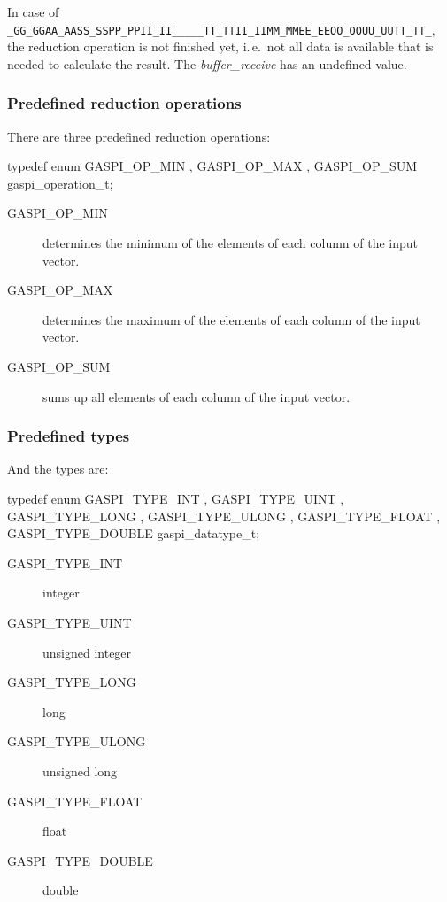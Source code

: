 \documentclass[a4paper]{article}
\makeatletter
\newlength{\st}\setlength{\st}{0pt}
\newcommand{\zerowsep}{\hskip 0pt plus 0.1pt minus 0.1pt}
\newcommand{\ZSEP}[1]{\ifx#1\@@@EOZ@@@\let\next\relax\else\ifx#1\_#1\zerowsep\else#1\fi\let\next\ZSEP\fi\next}
\newcommand{\zsep}[1]{\ZSEP{}#1\@@@EOZ@@@}
\newcommand{\gaspiprefix}{gaspi}
\newcommand{\function}[1]{{\tt #1}}
\newcommand{\parameter}[1]{{\it #1}}
\newcommand{\gaspifunction}[1]{\function{\protect\zsep{\gaspiprefix\_#1}}}
\newcommand{\GASPITIME}{{\tt\protect\zsep{GASPI\_TIMEOUT}}}
\makeatother
\begin{document}

In case of \GASPITIME{}, the reduction operation is not finished yet,
i.\,e.\ not all data is available that is needed to calculate the
result. The \parameter{buffer\_receive} has an undefined value.

\subsubsection{Predefined reduction operations}

There are three predefined reduction operations:

\begin{listing}[99]{2}
typedef enum { GASPI_OP_MIN
             , GASPI_OP_MAX
             , GASPI_OP_SUM
             } gaspi_operation_t;
\end{listing}

\begin{description}
\item[GASPI\_OP\_MIN] determines the minimum of the elements of each column of the input vector.
\item[GASPI\_OP\_MAX] determines the maximum of the elements of each column of the input vector.
\item[GASPI\_OP\_SUM] sums up all elements of each column of the input vector.
\end{description}


\subsubsection{Predefined types}

And the types are:
\begin{listing}[99]{2}
typedef enum { GASPI_TYPE_INT
             , GASPI_TYPE_UINT
             , GASPI_TYPE_LONG
             , GASPI_TYPE_ULONG
             , GASPI_TYPE_FLOAT
             , GASPI_TYPE_DOUBLE
             } gaspi_datatype_t;
\end{listing}

\begin{description}
\item[GASPI\_TYPE\_INT] integer
\item[GASPI\_TYPE\_UINT] unsigned integer
\item[GASPI\_TYPE\_LONG] long
\item[GASPI\_TYPE\_ULONG] unsigned long
\item[GASPI\_TYPE\_FLOAT] float
\item[GASPI\_TYPE\_DOUBLE] double
\end{description}
\end{document}

